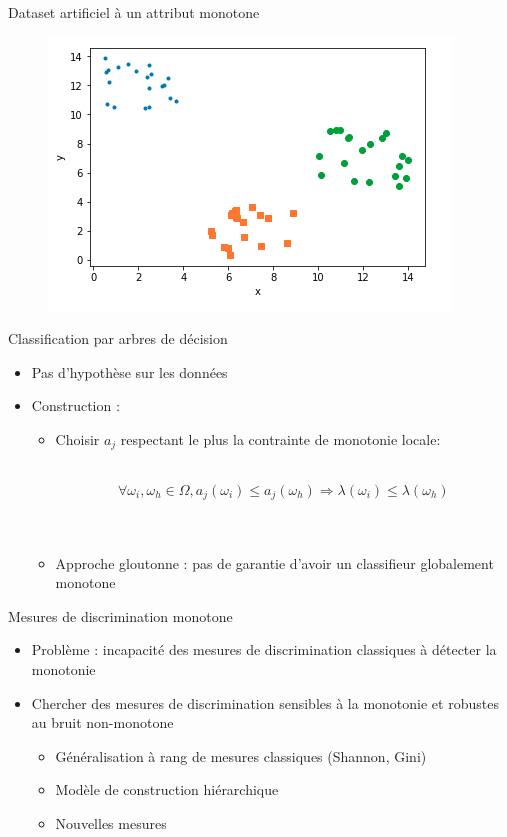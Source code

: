 \documentclass[usenames,dvipsnames]{beamer}
\newcommand{\beamcite}[1]{\hfill {\footnotesize \textcite{#1}}}
\begin{document}
\begin{frame}{Dataset artificiel à un attribut monotone}

\begin{figure}
	\includegraphics[width=.7\textwidth]{artificial-dataset.png}
\end{figure}

\end{frame}

\begin{frame}{Classification par arbres de décision}
\begin{itemize}
\item Pas d'hypothèse sur les données
\item Construction :
\begin{itemize}
\item Choisir $a_j$ respectant le plus la contrainte de monotonie locale: \\~\

$$\forall \omega_i, \omega_h \in \Omega, a_j(\omega_i) \leq a_j(\omega_h) \Rightarrow \lambda(\omega_i) \leq \lambda(\omega_h)$$ \\~\

\item Approche gloutonne : pas de garantie d'avoir un classifieur globalement monotone

\end{itemize}
\end{itemize}

\end{frame}

\begin{frame}{Mesures de discrimination monotone}
    \begin{itemize}
    \item Problème : incapacité des mesures de discrimination classiques à détecter la monotonie 
    \item Chercher des mesures de discrimination sensibles à la monotonie et robustes au bruit non-monotone \beamcite{marsala-rank}
    \begin{itemize}
        \item Généralisation à rang de mesures classiques (Shannon, Gini)
        \item Modèle de construction hiérarchique
        \item Nouvelles mesures
    \end{itemize}
\end{itemize}
\end{frame}
\end{document}
